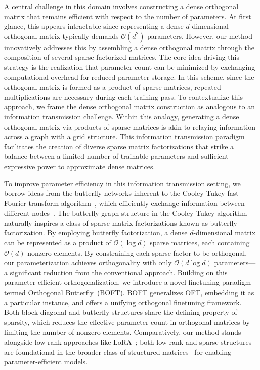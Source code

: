 A central challenge in this domain involves constructing a dense orthogonal matrix that remains efficient with respect to the number of parameters. At first glance, this appears intractable since representing a dense $d$-dimensional orthogonal matrix typically demands $\mathcal{O}(d^2)$ parameters. However, our method innovatively addresses this by assembling a dense orthogonal matrix through the composition of several sparse factorized matrices. The core idea driving this strategy is the realization that parameter count can be minimized by exchanging computational overhead for reduced parameter storage. In this scheme, since the orthogonal matrix is formed as a product of sparse matrices, repeated multiplications are necessary during each training pass. To contextualize this approach, we frame the dense orthogonal matrix construction as analogous to an information transmission challenge. Within this analogy, generating a dense orthogonal matrix via products of sparse matrices is akin to relaying information across a graph with a grid structure. This information transmission paradigm facilitates the creation of diverse sparse matrix factorizations that strike a balance between a limited number of trainable parameters and sufficient expressive power to approximate dense matrices.

To improve parameter efficiency in this information transmission setting, we borrow ideas from the butterfly networks inherent to the Cooley-Tukey fast Fourier transform algorithm~\cite{cooley1965algorithm}, which efficiently exchange information between different nodes~\cite{klasing1994broadcasting}. The butterfly graph structure in the Cooley-Tukey algorithm naturally inspires a class of sparse matrix factorizations known as butterfly factorization. By employing butterfly factorization, a dense $d$-dimensional matrix can be represented as a product of $\mathcal{O}(\log d)$ sparse matrices, each containing $\mathcal{O}(d)$ nonzero elements. By constraining each sparse factor to be orthogonal, our parameterization achieves orthogonality with only $\mathcal{O}(d\log d)$ parameters—a significant reduction from the conventional approach. Building on this parameter-efficient orthogonalization, we introduce a novel finetuning paradigm termed Orthogonal Butterfly~(BOFT). BOFT generalizes OFT, embedding it as a particular instance, and offers a unifying orthogonal finetuning framework. Both block-diagonal and butterfly structures share the defining property of sparsity, which reduces the effective parameter count in orthogonal matrices by limiting the number of nonzero elements. Comparatively, our method stands alongside low-rank approaches like LoRA~\cite{hulora2022}; both low-rank and sparse structures are foundational in the broader class of structured matrices~\cite{candes2011robust} for enabling parameter-efficient models.

